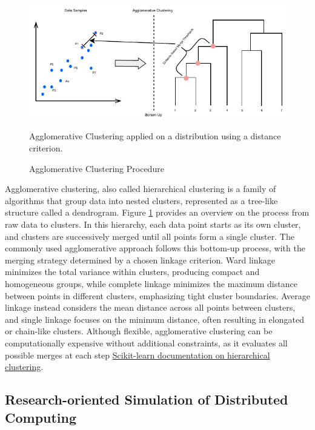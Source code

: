 \begin{figure}[H]
    \centering
    \includegraphics{fig/02/02-clustering.pdf}
    \small
    \caption{Agglomerative Clustering Procedure}
    \label{fig:02-clustering}
    \tiny
    Agglomerative Clustering applied on a distribution using a distance criterion.
\end{figure}

Agglomerative clustering, also called hierarchical clustering is a family of algorithms that group data into nested clusters, represented as a tree-like structure called a dendrogram. Figure \ref{fig:02-clustering} provides an overview on the process from raw data to clusters. In this hierarchy, each data point starts as its own cluster, and clusters are successively merged until all points form a single cluster. The commonly used agglomerative approach follows this bottom-up process, with the merging strategy determined by a chosen linkage criterion. Ward linkage minimizes the total variance within clusters, producing compact and homogeneous groups, while complete linkage minimizes the maximum distance between points in different clusters, emphasizing tight cluster boundaries. Average linkage instead considers the mean distance across all points between clusters, and single linkage focuses on the minimum distance, often resulting in elongated or chain-like clusters. Although flexible, agglomerative clustering can be computationally expensive without additional constraints, as it evaluates all possible merges at each step \href{https://scikit-learn.org/stable/modules/clustering.html#hierarchical-clustering}{Scikit-learn documentation on hierarchical clustering}.

\subsection{Research-oriented Simulation of Distributed Computing}
\label{sec:background_simulation}

